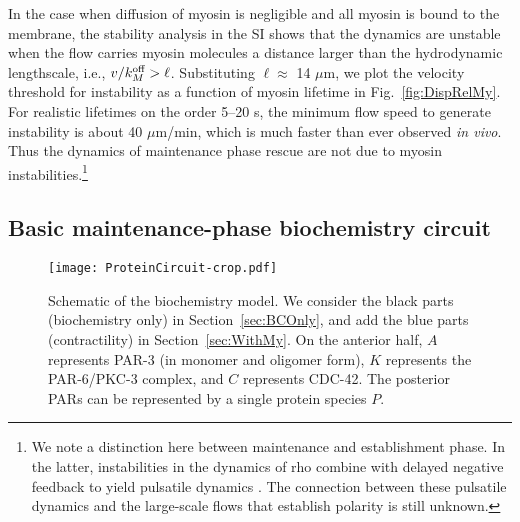 \documentclass[11pt]{article}
\newcommand{\6}[1]{#1_{\text{6}}}
\newcommand{\3}[1]{#1_{\text{3}}}
\begin{document}
In the case when diffusion of myosin is negligible and all myosin is bound to the membrane, the stability analysis in the SI shows that the dynamics are unstable when the flow carries myosin molecules a distance larger than the hydrodynamic lengthscale, i.e., $v / k^\text{off}_M > \ell$. Substituting $\ell \approx$ 14 $\mu$m, we plot the velocity threshold for instability as a function of myosin lifetime in Fig.\ \ref{fig:DispRelMy}. For realistic lifetimes on the order 5--20 s, the minimum flow speed to generate instability is about 40 $\mu$m/min, which is much faster than ever observed \emph{in vivo}. Thus the dynamics of maintenance phase rescue are not due to myosin instabilities.\footnote{We note a distinction here between maintenance and establishment phase. In the latter, instabilities in the dynamics of rho combine with delayed negative feedback to yield pulsatile dynamics \cite{nishikawa2017controlling, michaux2018excitable, michaud2022versatile}. The connection between these pulsatile dynamics and the large-scale flows that establish polarity is still unknown.}


\subsection{Basic maintenance-phase biochemistry circuit \label{sec:BCOnly}}
\begin{figure}
\centering
\texttt{[image: ProteinCircuit-crop.pdf]}
\caption{\label{fig:ModelSch}Schematic of the biochemistry model. We consider the black parts (biochemistry only) in Section\ \ref{sec:BCOnly}, and add the blue parts (contractility) in Section\ \ref{sec:WithMy}. On the anterior half, $A$ represents PAR-3 (in monomer and oligomer form), $K$ represents the PAR-6/PKC-3 complex, and $C$ represents CDC-42. The posterior PARs can be represented by a single protein species $P$.}
\end{figure}
\end{document}
